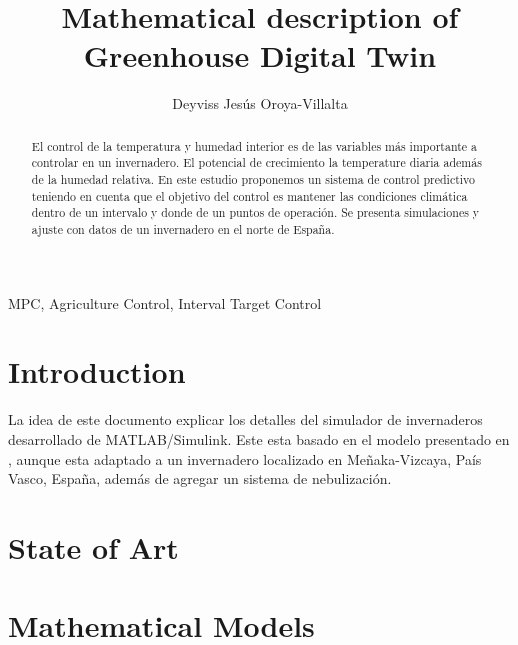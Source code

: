 \documentclass[5p,twocolumn]{elsarticle}
\begin{document}
\begin{frontmatter}

\title{\textbf{Mathematical description of Greenhouse Digital Twin}}



\author[UD]{Deyviss Jesús Oroya-Villalta}

\address[UD]{Universidad de Deusto, Avenida de las Universidades 24, 48007 Bilbao, Basque Country, Spain}

\begin{abstract}
    El control de la temperatura y humedad interior es de las variables más importante a controlar en un invernadero. El potencial de crecimiento la temperature diaria además de la humedad relativa. En este estudio proponemos un sistema de control predictivo teniendo en cuenta que el objetivo del control es mantener las condiciones climática dentro de un intervalo y donde de un puntos de operación. Se presenta simulaciones y ajuste con datos de un invernadero en el norte de España.
\end{abstract}

\begin{keyword}
MPC, Agriculture Control, Interval Target Control
\end{keyword}

\end{frontmatter} 
\renewcommand{\arraystretch}{1.5}

\section{Introduction}

La idea de este documento explicar los detalles del simulador de invernaderos desarrollado de MATLAB/Simulink. Este esta basado en el modelo presentado en \cite{Vanthoor2011}, aunque esta adaptado a un invernadero localizado en Meñaka-Vizcaya, País Vasco, España, además de agregar un sistema de nebulización. 

\section{State of Art}

\section{Mathematical Models}
\end{document}

